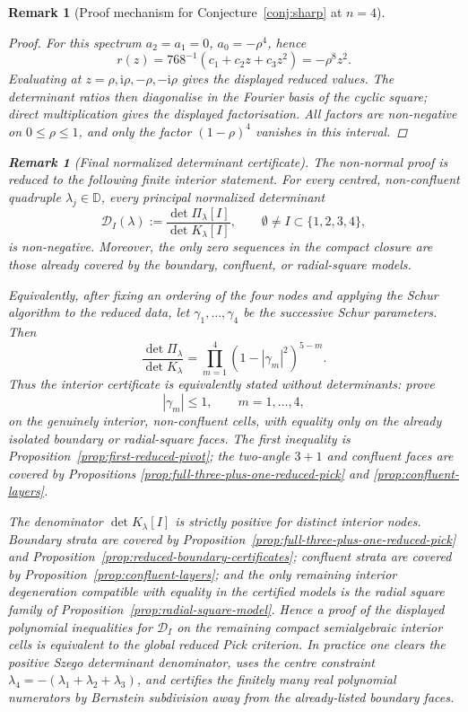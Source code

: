 \documentclass[11pt]{article}
\newtheorem{remark}[theorem]{Remark}
\numberwithin{equation}{section}
\newcommand{\bbD}{\mathbb D}
\newcommand{\ii}{\mathrm i}
\begin{document}
\begin{remark}[Proof mechanism for Conjecture~\ref{conj:sharp} at $n=4$]
\begin{proof}
For this spectrum \(a_2=a_1=0\), \(a_0=-\rho^4\), hence
\[
  r(z)=768^{-1}(c_1+c_2z+c_3z^2)=-\rho^8 z^2 .
\]
Evaluating at \(z=\rho, \ii\rho,-\rho,-\ii\rho\) gives the displayed reduced
values.  The determinant ratios then diagonalise in the Fourier basis of the
cyclic square; direct multiplication gives the displayed factorisation.  All
factors are non-negative on \(0\le\rho\le1\), and only the factor
\((1-\rho)^4\) vanishes in this interval.
\end{proof}

\begin{remark}[Final normalized determinant certificate]\label{rem:final-normalized-determinant}
The non-normal proof is reduced to the following finite interior statement.
For every
centred, non-confluent quadruple \(\lambda_j\in\bbD\), every principal
normalized determinant
\[
  \mathcal D_I(\lambda):=
  \frac{\det \Pi_\lambda[I]}{\det K_\lambda[I]},
  \qquad \emptyset\ne I\subset\{1,2,3,4\},
\]
is non-negative.  Moreover, the only zero sequences in the compact closure are
those already covered by the boundary, confluent, or radial-square models.

Equivalently, after fixing an ordering of the four nodes and applying the
Schur algorithm to the reduced data, let
\(\gamma_1,\ldots,\gamma_4\) be the successive Schur parameters.  Then
\[
  \frac{\det \Pi_\lambda}{\det K_\lambda}
  =
  \prod_{m=1}^4(1-|\gamma_m|^2)^{5-m}.
\]
Thus the interior certificate is equivalently stated without determinants:
prove
\[
  |\gamma_m|\le1,\qquad m=1,\ldots,4,
\]
on the genuinely interior, non-confluent cells, with equality only on the
already isolated boundary or radial-square faces.  The first inequality is
Proposition~\ref{prop:first-reduced-pivot}; the two-angle \(3{+}1\) and
confluent faces are covered by Propositions
\ref{prop:full-three-plus-one-reduced-pick} and \ref{prop:confluent-layers}.

The denominator \(\det K_\lambda[I]\) is strictly positive for distinct interior
nodes.  Boundary strata are covered by
Proposition~\ref{prop:full-three-plus-one-reduced-pick} and
Proposition~\ref{prop:reduced-boundary-certificates}; confluent strata are
covered by Proposition~\ref{prop:confluent-layers}; and the only remaining
interior degeneration compatible with equality in the certified models is the
radial square family of
Proposition~\ref{prop:radial-square-model}.  Hence a proof of the displayed
polynomial inequalities for \(\mathcal D_I\) on the remaining compact
semialgebraic interior cells is equivalent to the global reduced Pick
criterion.  In practice one clears the positive Szego determinant denominator,
uses the centre constraint \(\lambda_4=-(\lambda_1+\lambda_2+\lambda_3)\), and
certifies the finitely many real polynomial numerators by Bernstein subdivision
away from the already-listed boundary faces.
\end{remark}


\end{remark}
\end{document}
